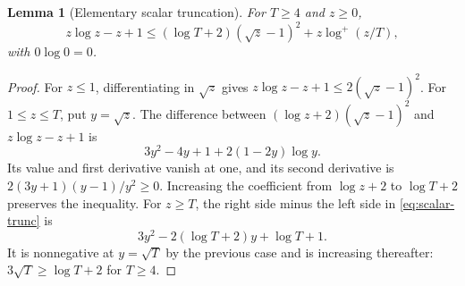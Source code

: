 \documentclass[11pt]{article}
\numberwithin{equation}{section}
\newtheorem{lemma}[theorem]{Lemma}
\theoremstyle{definition}\newtheorem{definition}[theorem]{Definition}
\theoremstyle{remark}\newtheorem{remark}[theorem]{Remark}
\begin{document}
\begin{lemma}[Elementary scalar truncation]\label{lem:scalar-trunc}
For $T\ge4$ and $z\ge0$,
\begin{equation}\label{eq:scalar-trunc}
 z\log z-z+1\le(\log T+2)(\sqrt z-1)^2+z\log^+(z/T),
\end{equation}
with $0\log0=0$.
\end{lemma}
\begin{proof}
For $z\le1$, differentiating in $\sqrt z$ gives
$z\log z-z+1\le2(\sqrt z-1)^2$.
For $1\le z\le T$, put $y=\sqrt z$. The difference between
$(\log z+2)(\sqrt z-1)^2$ and $z\log z-z+1$ is
\[
 3y^2-4y+1+2(1-2y)\log y.
\]
Its value and first derivative vanish at one, and its second derivative is
$2(3y+1)(y-1)/y^2\ge0$. Increasing the coefficient from $\log z+2$ to
$\log T+2$ preserves the inequality. For $z\ge T$, the right side minus
the left side in \eqref{eq:scalar-trunc} is
\[
 3y^2-2(\log T+2)y+\log T+1.
\]
It is nonnegative at $y=\sqrt T$ by the previous case and is increasing
thereafter: $3\sqrt T\ge\log T+2$ for $T\ge4$.
\end{proof}
\end{document}

